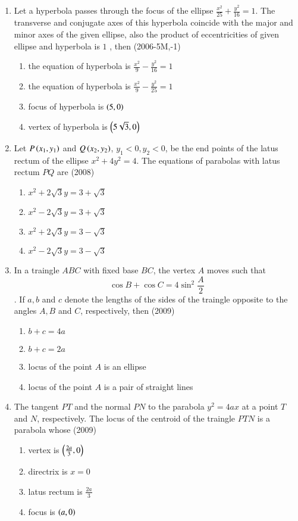 \documentclass[journal,12pt,onecolumn]{IEEEtran}
\theoremstyle{remark}
\begin{document}
\begin{enumerate}
\item Let a hyperbola passes through the focus of the ellipse $\frac{x^2}{25}+\frac{y^2}{16}=1$. The transverse and conjugate axes of this hyperbola coincide with the major and minor axes of the given ellipse, also the product of eccentricities of given ellipse and hyperbola is $1$ , then \hfill (2006-5M,-1)\\
	\begin{enumerate}
		\item the equation of hyperbola is $\frac{x^2}{9}-\frac{y^2}{16}=1$
		\item the equation of hyperbola is $\frac{x^2}{9}-\frac{y^2}{25}=1$
		\item focus of hyperbola is $\left(5,0\right)$
		\item vertex of hyperbola is $\left(5\sqrt{3},0\right)$
	\end{enumerate}

\item Let $P\left(x_{1},y_{1}\right)$ and $Q\left(x_{2},y_{2}\right)$, $y_{1}<0,y_{2}<0$, be the end points of the latus rectum of the ellipse $x^2+4y^2=4$. The equations of parabolas with latus rectum $PQ$ are \hfill(2008)\\
	\begin{enumerate}
		\item $x^2+2\sqrt{3}y=3+\sqrt{3}$
		\item $x^2-2\sqrt{3}y=3+\sqrt{3}$
		\item $x^2+2\sqrt{3}y=3-\sqrt{3}$
		\item $x^2-2\sqrt{3}y=3-\sqrt{3}$
	\end{enumerate}

\item In a traingle $ABC$ with fixed base $BC$, the vertex $A$ moves such that
	$$\cos{B}+\cos{C}=4\sin^2{\frac{A}{2}}$$.
		If $a,b$ and $c$ denote the lengths of the sides of the traingle opposite to the angles $A,B$ and $C$, respectively, then \hfill(2009)\\
		\begin{enumerate}
			\item $b+c=4a$
			\item $b+c=2a$
			\item locus of the point $A$ is an ellipse
			\item locus of the point $A$ is a pair of straight lines
		\end{enumerate}

\item The tangent $PT$ and the normal $PN$ to the parabola $y^2=4ax$ at a point $T$ and $N$, respectively. The locus of the centroid of the traingle $PTN$ is a parabola whose \hfill(2009)\\
		\begin{enumerate}
			\item vertex is $\left(\frac{2a}{3},0\right)$
			\item directrix is $x=0$
			\item latus rectum is $\frac{2a}{3}$
			\item focus is $\left(a,0\right)$
		\end{enumerate}


\end{enumerate}
\end{document}

